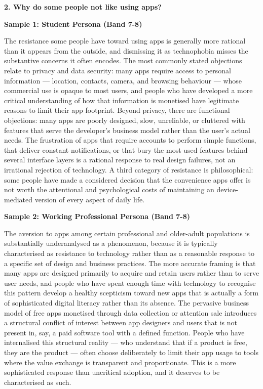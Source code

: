 \separator

\begin{ieltsquestion}
\textbf{2. Why do some people not like using apps?}
\end{ieltsquestion}
\textbf{Sample 1: Student Persona (Band 7-8)}

The resistance some people have toward using apps is generally more rational than it appears from the outside, and dismissing it as technophobia misses the substantive concerns it often encodes. The most commonly stated objections relate to privacy and data security: many apps require access to personal information — location, contacts, camera, and browsing behaviour — whose commercial use is opaque to most users, and people who have developed a more critical understanding of how that information is monetised have legitimate reasons to limit their app footprint. Beyond privacy, there are functional objections: many apps are poorly designed, slow, unreliable, or cluttered with features that serve the developer's business model rather than the user's actual needs. The frustration of apps that require accounts to perform simple functions, that deliver constant notifications, or that bury the most-used features behind several interface layers is a rational response to real design failures, not an irrational rejection of technology. A third category of resistance is philosophical: some people have made a considered decision that the convenience apps offer is not worth the attentional and psychological costs of maintaining an device-mediated version of every aspect of daily life.

\textbf{Sample 2: Working Professional Persona (Band 7-8)}

The aversion to apps among certain professional and older-adult populations is substantially underanalysed as a phenomenon, because it is typically characterised as resistance to technology rather than as a reasonable response to a specific set of design and business practices. The more accurate framing is that many apps are designed primarily to acquire and retain users rather than to serve user needs, and people who have spent enough time with technology to recognise this pattern develop a healthy scepticism toward new apps that is actually a form of sophisticated digital literacy rather than its absence. The pervasive business model of free apps monetised through data collection or attention sale introduces a structural conflict of interest between app designers and users that is not present in, say, a paid software tool with a defined function. People who have internalised this structural reality — who understand that if a product is free, they are the product — often choose deliberately to limit their app usage to tools where the value exchange is transparent and proportionate. This is a more sophisticated response than uncritical adoption, and it deserves to be characterised as such.

